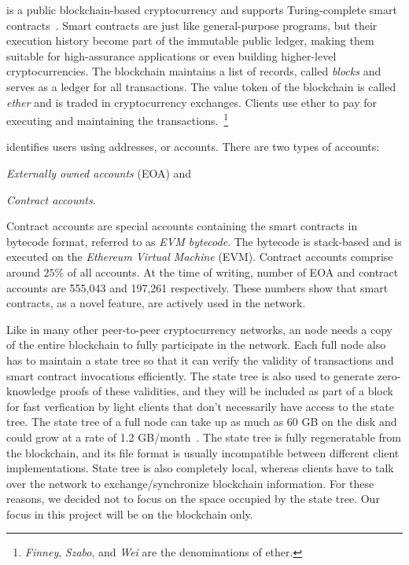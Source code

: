 
\eth{} is a public blockchain-based cryptocurrency and supports Turing-complete smart contracts~\cite{ethereum}.
Smart contracts are just like general-purpose programs, but their execution history become part of the immutable public
ledger, making them suitable for high-assurance applications or even building higher-level cryptocurrencies.
The \eth{} blockchain maintains a list of records, called \emph{blocks} and serves as a ledger for all transactions.
The value token of the blockchain is called \emph{ether} and 
is traded in cryptocurrency exchanges.
Clients use ether to pay for executing and maintaining the transactions.~\footnote{
\emph{Finney}, \emph{Szabo}, and \emph{Wei} are the denominations of ether.}

\eth{} identifies users using addresses, or accounts. There are two types of \eth{} accounts:
\renewcommand\labelenumi{(\theenumi)}
\begin{enumerate*}
	\item \emph{Externally owned accounts} (EOA) and
	\item \emph{Contract accounts}.
\end{enumerate*}
Contract accounts are special accounts containing the smart contracts in bytecode format, referred to as \emph{EVM bytecode}.
The bytecode is stack-based and is executed on the \emph{Ethereum Virtual Machine} (EVM).
Contract accounts comprise around $25\%$ of all \eth{} accounts.
At the time of writing, number of EOA and contract accounts are 555,043 and 197,261 respectively.
These numbers show that smart contracts, as a novel feature, are actively used in the \eth{} network.


Like in many other peer-to-peer cryptocurrency networks, an \eth{} node needs a copy of the entire blockchain to fully participate in the network.
Each full \eth{} node also has to maintain a state tree so that it can verify
the validity of transactions and smart contract invocations efficiently.
The state tree is also used to generate zero-knowledge proofs of these validities, and they will be included as part of a block for
fast verfication by light clients that don't necessarily have access to the state tree.
The state tree of a full node can take up as much as 60 GB on the disk and could grow at a rate of 1.2 GB/month~\cite{ethdiskspace}.
The state tree is fully regeneratable from the blockchain, and its file format is usually incompatible between different client implementations.
State tree is also completely local, whereas clients have to talk over the network to exchange/synchronize blockchain information.
For these reasons, we decided not to focus on the space occupied by the state tree.
Our focus in this project will be on the blockchain only.

